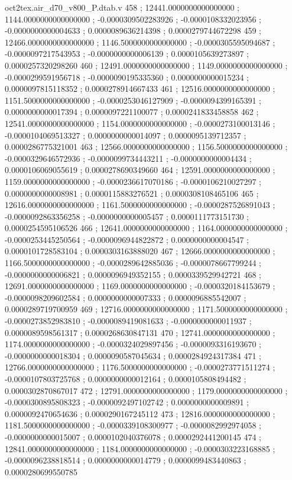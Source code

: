 \begin{filecontents}[overwrite]{oct2tex.air_d70_v800_P.dtab.v}
458 ; 12441.0000000000000000 ; 1144.0000000000000000 ; -0.0000309502283926 ; -0.0000108332023956 ; -0.0000000000004633 ; 0.0000089636214398 ; 0.0000279744672298
459 ; 12466.0000000000000000 ; 1146.5000000000000000 ; -0.0000305595094687 ; -0.0000097217543953 ; -0.0000000000006139 ; 0.0000105639273897 ; 0.0000257320298260
460 ; 12491.0000000000000000 ; 1149.0000000000000000 ; -0.0000299591956718 ; -0.0000090195335360 ; 0.0000000000015234 ; 0.0000097815118352 ; 0.0000278914667433
461 ; 12516.0000000000000000 ; 1151.5000000000000000 ; -0.0000253046127909 ; -0.0000094399165391 ; 0.0000000000017394 ; 0.0000097221100077 ; 0.0000241833458858
462 ; 12541.0000000000000000 ; 1154.0000000000000000 ; -0.0000273100013146 ; -0.0000104069513327 ; 0.0000000000014097 ; 0.0000095139712357 ; 0.0000286775321001
463 ; 12566.0000000000000000 ; 1156.5000000000000000 ; -0.0000329646572936 ; -0.0000099734443211 ; -0.0000000000004434 ; 0.0000106069055619 ; 0.0000278690349660
464 ; 12591.0000000000000000 ; 1159.0000000000000000 ; -0.0000236617070186 ; -0.0000106210027297 ; 0.0000000000008981 ; 0.0000115883276521 ; 0.0000308108465106
465 ; 12616.0000000000000000 ; 1161.5000000000000000 ; -0.0000287526891043 ; -0.0000092863356258 ; -0.0000000000005457 ; 0.0000111773151730 ; 0.0000254595106526
466 ; 12641.0000000000000000 ; 1164.0000000000000000 ; -0.0000253445250564 ; -0.0000096944822872 ; 0.0000000000004547 ; 0.0000101728583104 ; 0.0000303163888020
467 ; 12666.0000000000000000 ; 1166.5000000000000000 ; -0.0000289642885036 ; -0.0000078667799244 ; -0.0000000000006821 ; 0.0000096949352155 ; 0.0000339529942721
468 ; 12691.0000000000000000 ; 1169.0000000000000000 ; -0.0000320184153679 ; -0.0000098209602584 ; 0.0000000000007333 ; 0.0000096885542007 ; 0.0000289719700959
469 ; 12716.0000000000000000 ; 1171.5000000000000000 ; -0.0000273852983810 ; -0.0000089419081633 ; -0.0000000000011937 ; 0.0000089598561317 ; 0.0000268630847131
470 ; 12741.0000000000000000 ; 1174.0000000000000000 ; -0.0000324029897456 ; -0.0000093316193670 ; -0.0000000000018304 ; 0.0000090587045634 ; 0.0000284924317384
471 ; 12766.0000000000000000 ; 1176.5000000000000000 ; -0.0000273771511274 ; -0.0000107803725768 ; 0.0000000000012164 ; 0.0000105808494482 ; 0.0000302870867017
472 ; 12791.0000000000000000 ; 1179.0000000000000000 ; -0.0000300895808323 ; -0.0000092497102742 ; 0.0000000000009891 ; 0.0000092470654636 ; 0.0000290167245112
473 ; 12816.0000000000000000 ; 1181.5000000000000000 ; -0.0000339108300977 ; -0.0000082992974058 ; -0.0000000000015007 ; 0.0000102040376078 ; 0.0000292441200145
474 ; 12841.0000000000000000 ; 1184.0000000000000000 ; -0.0000303223168885 ; -0.0000096238818514 ; 0.0000000000014779 ; 0.0000099483440863 ; 0.0000280699550785

\end{filecontents}
